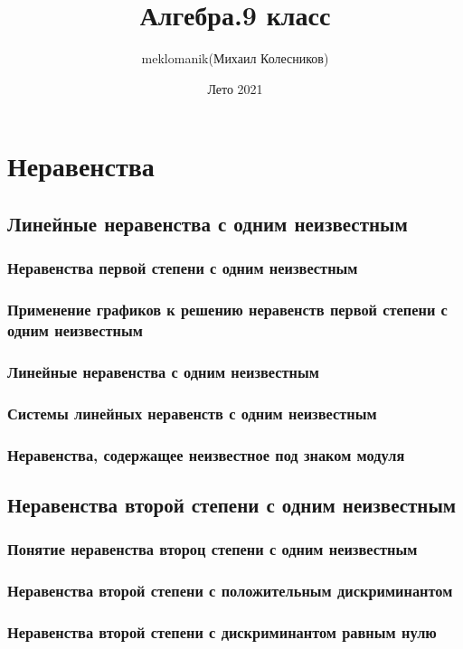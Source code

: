 \documentclass[a4paper, 12pt]{article}
\title{Алгебра.9 класс}
\author{meklomanik(Михаил Колесников)}
\date{Лето 2021}
\begin{document}
    \maketitle{} \clearpage 
    \tableofcontents \clearpage
    \section{Неравенства}
        \subsection{Линейные неравенства с одним неизвестным}
            \subsubsection{Неравенства первой степени с одним неизвестным}
            \subsubsection{Применение графиков к решению неравенств первой степени с одним неизвестным}
            \subsubsection{Линейные неравенства с одним неизвестным}
            \subsubsection{Системы линейных неравенств с одним неизвестным}
            \subsubsection{Неравенства, содержащее неизвестное под знаком модуля}
        \subsection{Неравенства второй степени с одним неизвестным}
            \subsubsection{Понятие неравенства второц степени с одним неизвестным}
            \subsubsection{Неравенства второй степени с положительным дискриминантом}
            \subsubsection{Неравенства второй степени с дискриминантом равным нулю}
\end{document}
